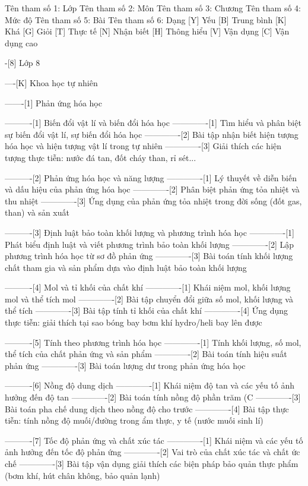 %
Tên tham số 1: Lớp
Tên tham số 2: Môn
Tên tham số 3: Chương
Tên tham số 4: Mức độ
Tên tham số 5: Bài
Tên tham số 6: Dạng
%
%
[Y] Yếu
[B] Trung bình
[K] Khá
[G] Giỏi
[T] Thực tế
[N] Nhận biết
[H] Thông hiểu
[V] Vận dụng
[C] Vận dụng cao

-[8] Lớp 8

----[K] Khoa học tự nhiên

-------[1] Phản ứng hóa học

----------[1] Biến đổi vật lí và biến đổi hóa học
-------------[1] Tìm hiểu và phân biệt sự biến đổi vật lí, sự biến đổi hóa học
-------------[2] Bài tập nhận biết hiện tượng hóa học và hiện tượng vật lí trong tự nhiên
-------------[3] Giải thích các hiện tượng thực tiễn: nước đá tan, đốt cháy than, rỉ sét...

----------[2] Phản ứng hóa học và năng lượng
-------------[1] Lý thuyết về diễn biến và dấu hiệu của phản ứng hóa học
-------------[2] Phân biệt phản ứng tỏa nhiệt và thu nhiệt
-------------[3] Ứng dụng của phản ứng tỏa nhiệt trong đời sống (đốt gas, than) và sản xuất

----------[3] Định luật bảo toàn khối lượng và phương trình hóa học
-------------[1] Phát biểu định luật và viết phương trình bảo toàn khối lượng
-------------[2] Lập phương trình hóa học từ sơ đồ phản ứng
-------------[3] Bài toán tính khối lượng chất tham gia và sản phẩm dựa vào định luật bảo toàn khối lượng

----------[4] Mol và tỉ khối của chất khí
-------------[1] Khái niệm mol, khối lượng mol và thể tích mol
-------------[2] Bài tập chuyển đổi giữa số mol, khối lượng và thể tích
-------------[3] Bài tập tính tỉ khối của chất khí
-------------[4] Ứng dụng thực tiễn: giải thích tại sao bóng bay bơm khí hydro/heli bay lên được

----------[5] Tính theo phương trình hóa học
-------------[1] Tính khối lượng, số mol, thể tích của chất phản ứng và sản phẩm
-------------[2] Bài toán tính hiệu suất phản ứng
-------------[3] Bài toán lượng dư trong phản ứng hóa học

----------[6] Nồng độ dung dịch
-------------[1] Khái niệm độ tan và các yếu tố ảnh hưởng đến độ tan
-------------[2] Bài toán tính nồng độ phần trăm (C%
-------------[3] Bài toán pha chế dung dịch theo nồng độ cho trước
-------------[4] Bài tập thực tiễn: tính nồng độ muối/đường trong ẩm thực, y tế (nước muối sinh lí)

----------[7] Tốc độ phản ứng và chất xúc tác
-------------[1] Khái niệm và các yếu tố ảnh hưởng đến tốc độ phản ứng
-------------[2] Vai trò của chất xúc tác và chất ức chế
-------------[3] Bài tập vận dụng giải thích các biện pháp bảo quản thực phẩm (bơm khí, hút chân không, bảo quản lạnh)

